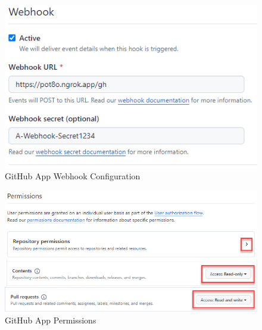 \begin{figure}[ht]
    \includegraphics[width=\textwidth]{graphics/gh-app-cfg-2.png}
    \caption{GitHub App Webhook Configuration}
    \label{fig:gh-app-cfg-2}
\end{figure}

\begin{figure}[ht]
    \includegraphics[width=\textwidth]{graphics/gh-app-cfg-3.png}
    \caption{GitHub App Permissions}
    \label{fig:gh-app-cfg-3}
\end{figure}

